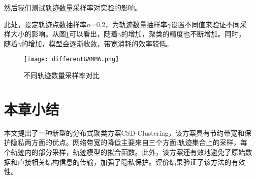然后我们测试轨迹数量采样率对实验的影响。

此处，设定轨迹点数抽样率$\alpha$=0.2，为轨迹数量抽样率$\gamma$设置不同值来验证不同采样大小的影响。从图\ref{differentGAMMA}可以看出，随着$\gamma$的增加，聚类的精度也不断增加。同时，随着$\gamma$的增加，模型会逐渐收敛，带宽消耗的效率较低。
\begin{figure}[H]
	\texttt{[image: differentGAMMA.png]}
	\caption{不同轨迹数量采样率对比}
	\label{differentGAMMA}
\end{figure}

\section{本章小结}

本文提出了一种新型的分布式聚类方案CSD-Clustering，该方案具有节约带宽和保护隐私两方面的优点。网络带宽的降低主要来自三个方面:轨迹集合上的采样，每个轨迹内的部分采样，轨迹模型的拟合函数。此外，该方案还有效地避免了原始数据和直接相关结构信息的传输，加强了隐私保护。评价结果验证了该方法的有效性。
